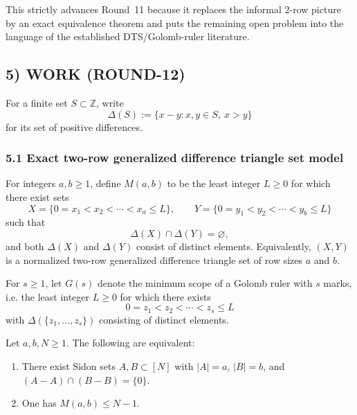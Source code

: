 This strictly advances Round~11 because it replaces the informal 2-row picture by an exact equivalence theorem and puts the remaining open problem into the language of the established DTS/Golomb-ruler literature.

\subsection{5) WORK (ROUND-12)}

For a finite set $S\subset \mathbb Z$, write
\[
\Delta(S):=\{x-y:x,y\in S,\ x>y\}
\]
for its set of positive differences.

\subsubsection{5.1 Exact two-row generalized difference triangle set model}

\begin{definition}
For integers $a,b\ge 1$, define $M(a,b)$ to be the least integer $L\ge 0$ for which there exist sets
\[
X=\{0=x_1<x_2<\cdots <x_a\le L\},\qquad
Y=\{0=y_1<y_2<\cdots <y_b\le L\}
\]
such that
\[
\Delta(X)\cap \Delta(Y)=\varnothing,
\]
and both $\Delta(X)$ and $\Delta(Y)$ consist of distinct elements. Equivalently, $(X,Y)$ is a normalized two-row generalized difference triangle set of row sizes $a$ and $b$.
\end{definition}

\begin{definition}
For $s\ge 1$, let $G(s)$ denote the minimum scope of a Golomb ruler with $s$ marks, i.e. the least integer $L\ge 0$ for which there exists
\[
0=z_1<z_2<\cdots <z_s\le L
\]
with $\Delta(\{z_1,\dots,z_s\})$ consisting of distinct elements.
\end{definition}

\begin{lemma}
\label{lem:dts-equivalence}
Let $a,b,N\ge 1$. The following are equivalent:
\begin{enumerate}
\item There exist Sidon sets $A,B\subset [N]$ with $|A|=a$, $|B|=b$, and $(A-A)\cap(B-B)=\{0\}$.
\item One has $M(a,b)\le N-1$.
\end{enumerate}
\end{lemma}

